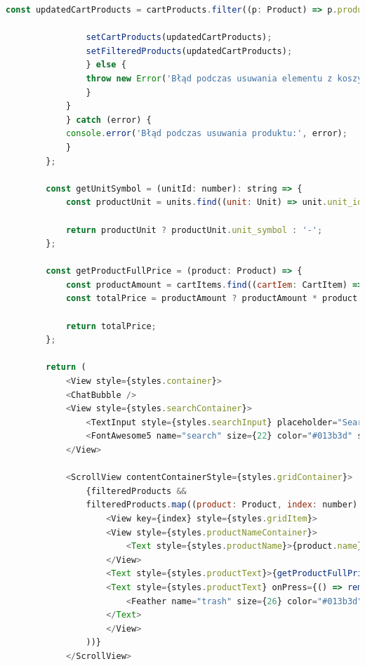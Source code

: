 \begin{lstlisting}[language=JavaScript, caption=Koszyk użytkownika implementacja, label=lst:view]
                const updatedCartProducts = cartProducts.filter((p: Product) => p.product_id !== product.product_id);

                setCartProducts(updatedCartProducts);
                setFilteredProducts(updatedCartProducts);
                } else {
                throw new Error('Błąd podczas usuwania elementu z koszyka');
                }
            }
            } catch (error) {
            console.error('Błąd podczas usuwania produktu:', error);
            }
        };

        const getUnitSymbol = (unitId: number): string => {
            const productUnit = units.find((unit: Unit) => unit.unit_id === unitId);

            return productUnit ? productUnit.unit_symbol : '-';
        };

        const getProductFullPrice = (product: Product) => {
            const productAmount = cartItems.find((cartIem: CartItem) => cartIem.product_id === product.product_id)?.quantity;
            const totalPrice = productAmount ? productAmount * product.price : '-';

            return totalPrice;
        };

        return (
            <View style={styles.container}>
            <ChatBubble />
            <View style={styles.searchContainer}>
                <TextInput style={styles.searchInput} placeholder="Search products" value={searchQuery} onChangeText={handleSearch} selectionColor="#013b3d" />
                <FontAwesome5 name="search" size={22} color="#013b3d" style={styles.searchIcon} />
            </View>

            <ScrollView contentContainerStyle={styles.gridContainer}>
                {filteredProducts &&
                filteredProducts.map((product: Product, index: number) => (
                    <View key={index} style={styles.gridItem}>
                    <View style={styles.productNameContainer}>
                        <Text style={styles.productName}>{product.name}</Text>
                    </View>
                    <Text style={styles.productText}>{getProductFullPrice(product) + ' $'}</Text>
                    <Text style={styles.productText} onPress={() => removeFromCart(product)}>
                        <Feather name="trash" size={26} color="#013b3d" style={styles.searchIcon} />
                    </Text>
                    </View>
                ))}
            </ScrollView>


\end{lstlisting}
